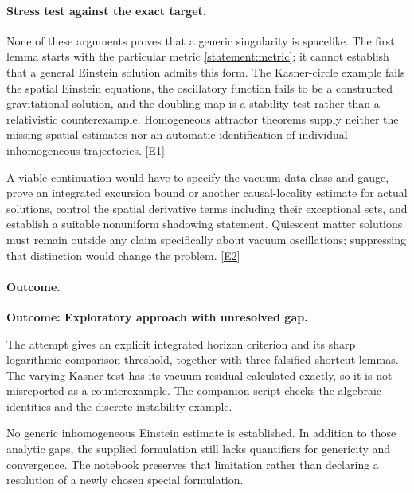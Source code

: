 \documentclass[11pt,a4paper]{article}
\newcommand{\eref}[2]{\hyperlink{extra:#1:#2}{[E#2]}}
\numberwithin{equation}{section}
\begin{document}
\paragraph{Stress test against the exact target.}
None of these arguments proves that a generic singularity is spacelike.
The first lemma starts with the particular metric \eqref{statement:metric}; it
cannot establish that a general Einstein solution admits this form. The
Kasner-circle example fails the spatial Einstein equations, the oscillatory
function fails to be a constructed gravitational solution, and the doubling
map is a stability test rather than a relativistic counterexample.
Homogeneous attractor theorems supply neither the missing spatial estimates
nor an automatic identification of individual inhomogeneous trajectories.
\eref{statement}{1}

A viable continuation would have to specify the vacuum data class and gauge,
prove an integrated excursion bound or another causal-locality estimate for
actual solutions, control the spatial derivative terms including their
exceptional sets, and establish a suitable nonuniform shadowing statement.
Quiescent matter solutions must remain outside any claim specifically about
vacuum oscillations; suppressing that distinction would change the problem.
\eref{statement}{2}

\paragraph{Outcome.}
\textbf{Outcome: Exploratory approach with unresolved gap.}

The attempt gives an explicit integrated horizon criterion and its sharp
logarithmic comparison threshold, together with three falsified shortcut
lemmas. The varying-Kasner test has its vacuum residual calculated exactly,
so it is not misreported as a counterexample. The companion script checks
the algebraic identities and the discrete instability example.

No generic inhomogeneous Einstein estimate is established. In addition to
those analytic gaps, the supplied formulation still lacks quantifiers for
genericity and convergence. The notebook preserves that limitation rather
than declaring a resolution of a newly chosen special formulation.
\end{document}
